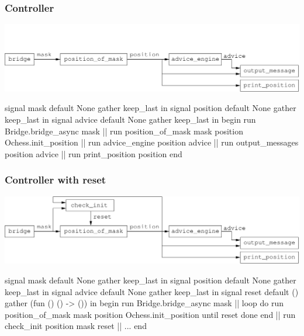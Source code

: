 \documentclass[t]{beamer}
\begin{document}
\begin{frame}[fragile]
\frametitle{Controller}

\includegraphics[scale=0.6]{figures/controller}

\pause

\begin{lstrml}
  signal mask default None gather keep_last in
  signal position default None gather keep_last in
  signal advice default None gather keep_last in
  begin
    run Bridge.bridge_async mask ||
    run position_of_mask mask position Ochess.init_position ||
    run advice_engine position advice ||
    run output_messages position advice ||
    run print_position position
  end
\end{lstrml}

\end{frame}


\begin{frame}[fragile]
\frametitle{Controller with reset}

\includegraphics[scale=0.6]{figures/controller-with-reset}

\begin{lstrml}
  signal mask default None gather keep_last in
  signal position default None gather keep_last in
  signal advice default None gather keep_last in
  signal reset default () gather (fun () () -> ()) in
  begin
    run Bridge.bridge_async mask ||
    loop
      do
        run position_of_mask mask position Ochess.init_position
      until reset done
    end ||
    run check_init position mask reset ||
    ...
  end
\end{lstrml}

\end{frame}


\end{document}
